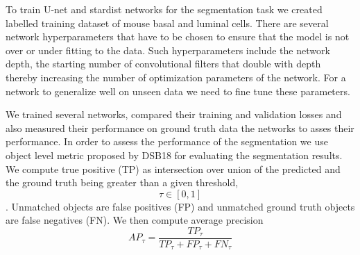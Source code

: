 \documentclass[letterpaper,compsoc,twoside]{IEEEtran}
\begin{document}
To train U-net and stardist networks for the segmentation task we created labelled training dataset of mouse basal and luminal cells. There are several network hyperparameters that have to be chosen to ensure that the model is not over or under fitting to the data. Such hyperparameters include the network depth, the starting number of convolutional filters that double with depth thereby increasing the number of optimization parameters of the network. For a network to generalize well on unseen data we need to fine tune these parameters.

We trained several networks, compared their training and validation losses and also measured their performance on ground truth data the networks to asses their performance. In order to assess the performance of the segmentation we use object level metric proposed by DSB18 for evaluating the segmentation results. We compute true positive (TP)  as intersection over union of the predicted and the ground truth being greater than a given threshold, $$\tau \in [0,1]$$. Unmatched objects are false positives (FP)  and unmatched ground truth objects are false negatives (FN). We then compute average precision $$AP_\tau= \frac{TP_\tau}{TP_\tau+ FP_\tau + FN_\tau} $$
\end{document}
